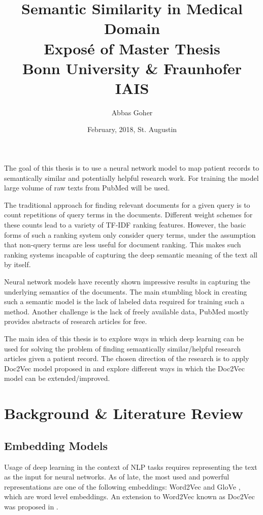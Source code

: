 \documentclass[12pt,a4paper] {article}
\begin{document}
	
	\title{Semantic Similarity in Medical Domain \\ \hphantom \newline
		\large     Expos\'{e} of Master Thesis
		\\Bonn University \& Fraunhofer IAIS}
	\author{Abbas Goher}
	\date{February, 2018, St. Augustin}
	\maketitle
	
	The goal of this thesis is to use a neural network model to map patient records to semantically similar and potentially helpful research work. For training the model large volume of raw texts from PubMed \cite{pubmed}  will be used.
	
	
	The traditional approach for finding relevant documents for a given query is to count repetitions of query terms in the documents. Different weight schemes for these counts lead to a variety of TF-IDF ranking features. However, the basic forms of such a ranking system only consider query terms, under the assumption that non-query terms are less useful for document ranking. This makes such ranking systems incapable of capturing the deep semantic meaning of the text all by itself. 
	
	Neural network models have recently shown impressive results in capturing the underlying semantics of the documents\cite{Bengio2006}.
	The main stumbling block in creating such a semantic model is the lack of labeled data required for training such a method. Another challenge is the lack of freely available data, PubMed mostly provides abstracts of research articles for free. 
	
	The main idea of this thesis is to explore ways in which deep learning can be used for solving the problem of finding semantically similar/helpful research articles given a patient record. The chosen direction of the research is to apply Doc2Vec model proposed in \cite{le2014distributed} and explore different ways in which the Doc2Vec model can be extended/improved.
	
	\section*{Background \& Literature Review}
	
	\subsection*{Embedding Models}
	Usage of deep learning in the context of NLP tasks requires representing the text as the input for neural networks. As of late, the most used and powerful representations are one of the following embeddings: Word2Vec \cite{mikolov2013efficient} and GloVe \cite{pennington2014glove}, which are word level embeddings. An extension to Word2Vec known as Doc2Vec was proposed in \cite{le2014distributed}.  
	
\end{document}
